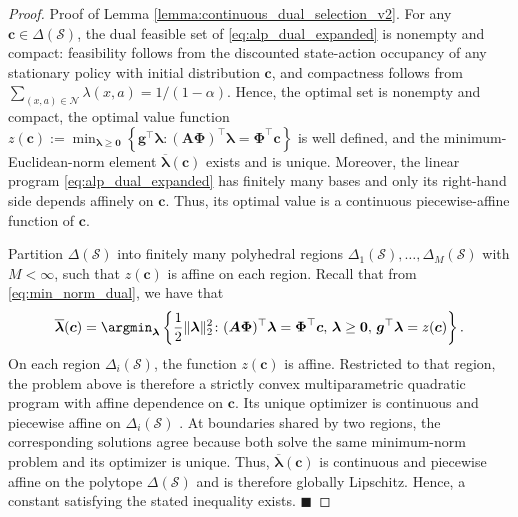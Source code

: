 \documentclass[sglanonrev]{informs4}
\providecommand{\bA}{\boldsymbol{A}}
\providecommand{\bPhi}{\boldsymbol{\Phi}}
\providecommand{\bc}{\boldsymbol{c}}
\providecommand{\bg}{\boldsymbol{g}}
\providecommand{\blambda}{\boldsymbol{\lambda}}
\providecommand{\bzero}{\boldsymbol{0}}
\def\edits#1{{\color{black}#1}}
\begin{document}
\begin{proof}{Proof of Lemma \ref{lemma:continuous_dual_selection_v2}.}
%
For any
$\bc\in\Delta(\mathcal S)$, the dual feasible set of \eqref{eq:alp_dual_expanded} is nonempty and
compact: feasibility follows from the discounted state-action occupancy
of any stationary policy with initial distribution $\bc$, and
compactness follows from
$\sum_{(x,a)\in\mathcal N}\lambda(x,a)=1/(1-\alpha)$. Hence, the optimal set is
nonempty and compact, the optimal value function 
$
z(\bc) := \min_{\blambda \ge \bzero} 
  \left \{ 
    \bg^\top\blambda \colon (\bA\bPhi)^\top\blambda=\bPhi^\top\bc 
  \right \}
$
is well defined, and the minimum-Euclidean-norm element
$\overline{\blambda}(\bc)$ exists and is unique. Moreover, the linear program \eqref{eq:alp_dual_expanded} has finitely many bases and only its right-hand side depends affinely on $\bc$. Thus,
its optimal value is a continuous piecewise-affine function of $\bc$. 

\edits{Partition $\Delta(\mathcal S)$ into finitely many polyhedral regions $\Delta_1(\mathcal S),\ldots,\Delta_M(\mathcal S)$ with $M<\infty$, such that $z(\bc)$ is affine on each region. Recall that from \eqref{eq:min_norm_dual}, we have that }
\begin{equation*}
\begin{aligned}
\overline{\blambda}(\bc) 
= 
\argmin_{\blambda} 
\left\{ 
  \frac{1}{2}\lVert\blambda\rVert_2^2
  \colon
  (\bA\bPhi)^\top\blambda=\bPhi^\top\bc, \,
  \blambda\geq\bzero,
  \,
  \bg^\top\blambda=z(\bc)
\right\}.
\end{aligned}
\end{equation*}
On each region $\Delta_i(\mathcal S)$, the function $z(\bc)$ is affine. Restricted to that region, the problem above is therefore a strictly convex multiparametric quadratic program with affine dependence on $\bc$. Its unique optimizer is continuous and piecewise affine on $\Delta_i(\mathcal S)$ \citep{bemporad2002explicit}. At boundaries shared by two regions, the corresponding solutions agree because both solve the same minimum-norm problem and its optimizer is unique. Thus,
$\overline{\blambda}(\bc)$ is continuous and piecewise affine on the
polytope $\Delta(\mathcal S)$ and is therefore globally Lipschitz.
Hence, a constant satisfying the stated inequality exists.
\hfill $\blacksquare$
\end{proof}
\end{document}
